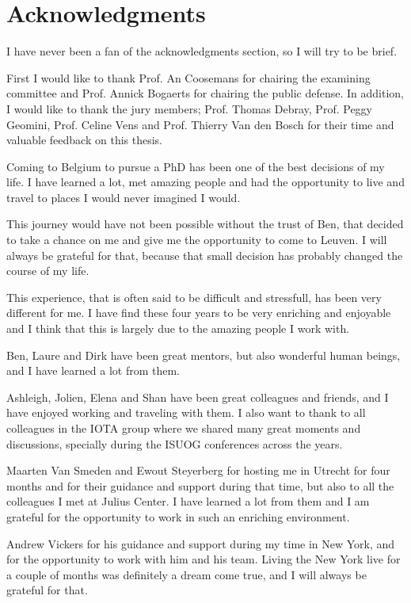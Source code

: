 \chapter*{Acknowledgments}

I have never been a fan of the acknowledgments section, so I will try to be brief.

First I would like to thank Prof. An Coosemans for chairing the examining committee and Prof. Annick Bogaerts for chairing the public defense. In addition, I would like to thank the jury members; Prof. Thomas Debray, Prof. Peggy Geomini, Prof. Celine Vens and Prof. Thierry Van den Bosch for their time and valuable feedback on this thesis.

Coming to Belgium to pursue a PhD has been one of the best decisions of my life. I have learned a lot, met amazing people and had the opportunity to live and travel to places I would never imagined I would. 

This journey would have not been possible without the trust of Ben, that decided to take a chance on me and give me the opportunity to come to Leuven. I will always be grateful for that, because that small decision has probably changed the course of my life. 

This experience, that is often said to be difficult and stressfull, has been very different for me. I have find these four years to be very enriching and enjoyable and I think that this is largely due to the amazing people I work with. 

Ben, Laure and Dirk have been great mentors, but also wonderful human beings, and I have learned a lot from them. 

Ashleigh, Jolien, Elena and Shan have been great colleagues and friends, and I have enjoyed working and traveling with them. I also want to thank to all colleagues in the IOTA group where we shared many great moments and discussions, specially during the ISUOG conferences across the years. 

Maarten Van Smeden and Ewout Steyerberg for hosting me in Utrecht for four months and for their guidance and support during that time, but also to all the colleagues I met at Julius Center. I have learned a lot from them and I am grateful for the opportunity to work in such an enriching environment.

Andrew Vickers for his guidance and support during my time in New York, and for the opportunity to work with him and his team. Living the New York live for a couple of months was definitely a dream come true, and I will always be grateful for that.

